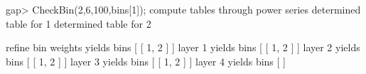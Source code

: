 gap> CheckBin(2,6,100,bins[1]);
compute tables through power series 
  determined table for 1
  determined table for 2

refine bin 
  weights yields bins [ [ 1, 2 ] ]
  layer 1 yields bins [ [ 1, 2 ] ]
  layer 2 yields bins [ [ 1, 2 ] ]
  layer 3 yields bins [ [ 1, 2 ] ]
  layer 4 yields bins [  ]
\endexample

